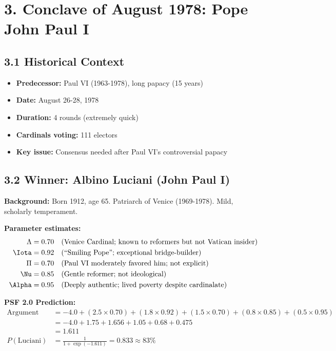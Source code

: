 \section{3. Conclave of August 1978: Pope John Paul I}

\subsection{3.1 Historical Context}

\begin{itemize}
\item \textbf{Predecessor:} Paul VI (1963-1978), long papacy (15 years)
\item \textbf{Date:} August 26-28, 1978
\item \textbf{Duration:} 4 rounds (extremely quick)
\item \textbf{Cardinals voting:} 111 electors
\item \textbf{Key issue:} Consensus needed after Paul VI's controversial papacy
\end{itemize}

\subsection{3.2 Winner: Albino Luciani (John Paul I)}

\textbf{Background:} Born 1912, age 65. Patriarch of Venice (1969-1978). Mild, scholarly temperament.

\textbf{Parameter estimates:}
\begin{align*}
\Lambda &= 0.70 \quad \text{(Venice Cardinal; known to reformers but not Vatican insider)} \\
\Iota &= 0.92 \quad \text{(``Smiling Pope''; exceptional bridge-builder)} \\
\Pi &= 0.70 \quad \text{(Paul VI moderately favored him; not explicit)} \\
\Nu &= 0.85 \quad \text{(Gentle reformer; not ideological)} \\
\Alpha &= 0.95 \quad \text{(Deeply authentic; lived poverty despite cardinalate)}
\end{align*}

\textbf{PSF 2.0 Prediction:}
\begin{align*}
\text{Argument} &= -4.0 + (2.5 \times 0.70) + (1.8 \times 0.92) + (1.5 \times 0.70) + (0.8 \times 0.85) + (0.5 \times 0.95) \\
&= -4.0 + 1.75 + 1.656 + 1.05 + 0.68 + 0.475 \\
&= 1.611 \\
P(\text{Luciani}) &= \frac{1}{1 + \exp(-1.611)} = 0.833 \approx 83\%
\end{align*}

